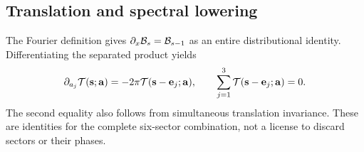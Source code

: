 \subsection{Translation and spectral lowering}
The Fourier definition gives $\partial_x\mathcal B_s=\mathcal B_{s-1}$ as an
entire distributional identity. Differentiating the separated product yields
\begin{equation}\label{tsc:lowering}
 \partial_{a_j}\mathcal T(\mathbf s;\mathbf a)
       =-2\pi\mathcal T(\mathbf s-\mathbf e_j;\mathbf a),
 \qquad
 \sum_{j=1}^3\mathcal T(\mathbf s-\mathbf e_j;\mathbf a)=0.
\end{equation}
The second equality also follows from simultaneous translation invariance.
These are identities for the complete six-sector combination, not a license
to discard sectors or their phases.
